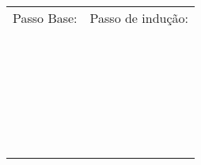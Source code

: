 \documentclass[16pt]{examdesign}
\begin{document}
\begin{fillin}[title={},
                    rearrange=no,resetcounter=no,suppressprefix]
\begin{question}
	
	\begin{tabular}{p{9cm}|p{10cm}} 
	Passo Base: 			&Passo de indução: \\
					& \\
					& \\
					& \\
					& \\
					& \\
					& \\
					& \\
					& \\
					& \\
					& \\
					& \\
					& \\
					& \\
					& \\
					& \\
					& \\
					& \\
					& \\
					& \\
					& \\
					& \\
					
					& \\
					& \\
					& \\
					& \\
					& \\
					& \\
	\end{tabular}
    \end{question}


\end{fillin}
\end{document}
